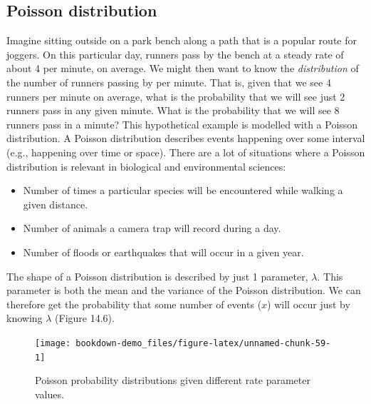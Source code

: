 \documentclass[
]{scrbook}
\providecommand{\tightlist}{%
  \setlength{\itemsep}{0pt}\setlength{\parskip}{0pt}}
\begin{document}
\hypertarget{poisson-distribution}{%
\subsection{Poisson distribution}\label{poisson-distribution}}

Imagine sitting outside on a park bench along a path that is a popular route for joggers.
On this particular day, runners pass by the bench at a steady rate of about 4 per minute, on average.
We might then want to know the \emph{distribution} of the number of runners passing by per minute.
That is, given that we see 4 runners per minute on average, what is the probability that we will see just 2 runners pass in any given minute.
What is the probability that we will see 8 runners pass in a minute?
This hypothetical example is modelled with a Poisson distribution.
A Poisson distribution describes events happening over some interval (e.g., happening over time or space).
There are a lot of situations where a Poisson distribution is relevant in biological and environmental sciences:

\begin{itemize}
\tightlist
\item
  Number of times a particular species will be encountered while walking a given distance.
\item
  Number of animals a camera trap will record during a day.
\item
  Number of floods or earthquakes that will occur in a given year.
\end{itemize}

The shape of a Poisson distribution is described by just 1 parameter, \(\lambda\).
This parameter is both the mean and the variance of the Poisson distribution.
We can therefore get the probability that some number of events (\(x\)) will occur just by knowing \(\lambda\) (Figure 14.6).

\begin{figure}
\texttt{[image: bookdown-demo\_files/figure-latex/unnamed-chunk-59-1]} \caption{Poisson probability distributions given different rate parameter values.}\label{fig:unnamed-chunk-59}
\end{figure}
\end{document}
